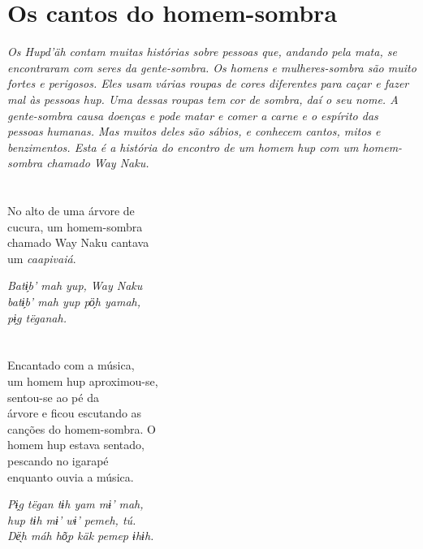 \chapter{Os cantos do homem-sombra}

\textit{Os Hupd'äh contam muitas histórias sobre pessoas que, andando pela mata, se
encontraram com seres da gente-sombra. Os homens e mulheres-sombra são muito fortes e perigosos. Eles usam várias roupas de cores diferentes para caçar e fazer mal às pessoas hup. Uma dessas roupas tem cor de sombra, daí o seu nome. A gente-sombra causa doenças e pode matar e comer a carne e o espírito das pessoas humanas. Mas muitos deles são sábios, e conhecem cantos, mitos e benzimentos. Esta é a história do encontro de um homem hup com um homem-sombra chamado Way Naku.}

\chapter{}

No alto de uma árvore de\\
cucura, um homem-sombra\\
chamado Way Naku cantava\\
um \textit{caapivaiá}.


\textit{Batɨ̗b’ mah yup, Way Naku\\
batɨ̗b’ mah yup pö̗h yamah,\\
pɨ̗g tëganah.}


\chapter{}

Encantado com a música,\\
um homem hup aproximou-se,\\
sentou-se ao pé da\\
árvore e ficou escutando as\\
canções do homem-sombra. O\\
homem hup estava sentado,\\
pescando no igarapé\\
enquanto ouvia a música.

\textit{Pɨ̗g tëgan tɨh yam mɨ’ mah,\\
hup tɨh mɨ’ wɨ’ pemeh, tú.\\
Dë̖h máh hõ̖p käk pemep ɨhɨh.}

\chapter{}

